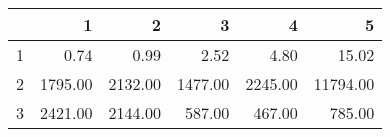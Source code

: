 \begin{table}[ht]
\centering
\begin{tabular}{rrrrrr}
  \hline
 & 1 & 2 & 3 & 4 & 5 \\ 
  \hline
1 & 0.74 & 0.99 & 2.52 & 4.80 & 15.02 \\ 
  2 & 1795.00 & 2132.00 & 1477.00 & 2245.00 & 11794.00 \\ 
  3 & 2421.00 & 2144.00 & 587.00 & 467.00 & 785.00 \\ 
   \hline
\end{tabular}
\end{table}
